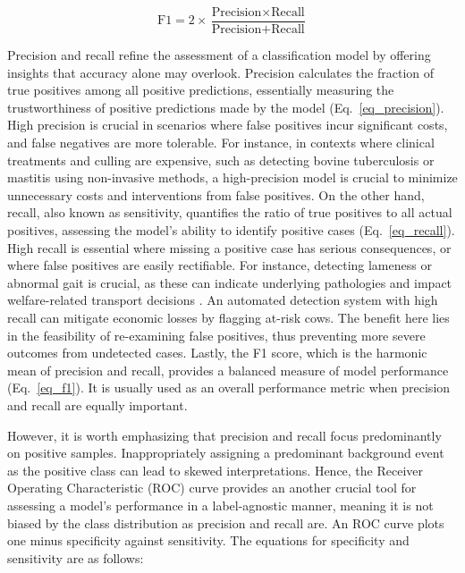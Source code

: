\begin{equation} \label{eq_f1}
    \text{F1} = 2 \times \frac{\text{Precision} \times \text{Recall}}{\text{Precision} + \text{Recall}}
\end{equation}

Precision and recall refine the assessment of a classification model by offering insights that accuracy alone may overlook. Precision calculates the fraction of true positives among all positive predictions, essentially measuring the trustworthiness of positive predictions made by the model (Eq.~\ref{eq_precision}). High precision is crucial in scenarios where false positives incur significant costs, and false negatives are more tolerable. For instance, in contexts where clinical treatments and culling are expensive, such as detecting bovine tuberculosis \citep{denholm_predicting_2020} or mastitis \citep{kandeel_ability_2019} using non-invasive methods, a high-precision model is crucial to minimize unnecessary costs and interventions from false positives. On the other hand, recall, also known as sensitivity, quantifies the ratio of true positives to all actual positives, assessing the model's ability to identify positive cases (Eq.~\ref{eq_recall}). High recall is essential where missing a positive case has serious consequences, or where false positives are easily rectifiable. For instance, detecting lameness or abnormal gait is crucial, as these can indicate underlying pathologies \citep{oleary_invited_2020} and impact welfare-related transport decisions \citep{stojkov_hot_2018}. An automated detection system \citep{oleary_invited_2020, alsaaod_automatic_2019,kang_accurate_2020} with high recall can mitigate economic losses by flagging at-risk cows. The benefit here lies in the feasibility of re-examining false positives, thus preventing more severe outcomes from undetected cases. Lastly, the F1 score, which is the harmonic mean of precision and recall, provides a balanced measure of model performance (Eq.~\ref{eq_f1}). It is usually used as an overall performance metric when precision and recall are equally important.

However, it is worth emphasizing that precision and recall focus predominantly on positive samples. Inappropriately assigning a predominant background event as the positive class can lead to skewed interpretations. Hence, the Receiver Operating Characteristic (ROC) curve provides an another crucial tool for assessing a model's performance in a label-agnostic manner, meaning it is not biased by the class distribution as precision and recall are. An ROC curve plots one minus specificity against sensitivity. The equations for specificity and sensitivity are as follows:


